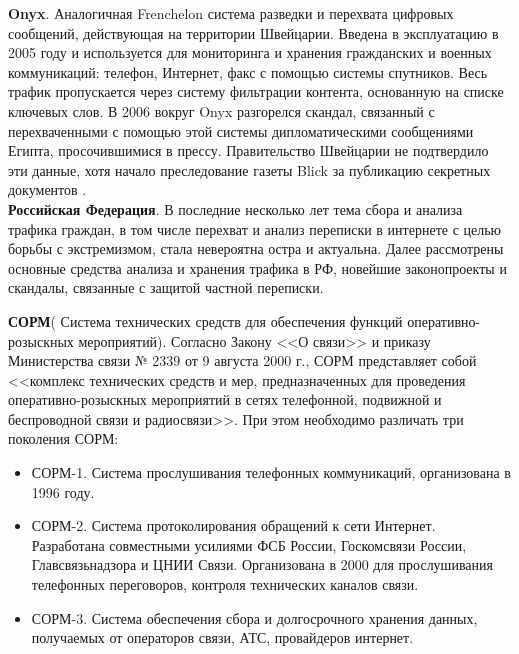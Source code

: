 	\textbf{Onyx}. Аналогичная Frenchelon система разведки и перехвата цифровых сообщений, действующая на территории Швейцарии. Введена в эксплуатацию в 2005 году	и используется для мониторинга и хранения гражданских и военных коммуникаций: телефон, Интернет, факс с помощью системы спутников. Весь трафик пропускается через систему фильтрации контента, основанную на списке ключевых слов. В 2006 вокруг Onyx разгорелся скандал, связанный с перехваченными с помощью этой системы дипломатическими сообщениями Египта, просочившимися в прессу. Правительство Швейцарии  не подтвердило эти данные, хотя начало преследование газеты  Blick за публикацию секретных документов \cite{Onyx}. %
	\\
	
	
	\textbf{Российская Федерация}.  В последние несколько лет тема сбора и анализа трафика граждан, в том числе перехват и анализ переписки в интернете с целью борьбы с экстремизмом, стала невероятна остра и актуальна. Далее рассмотрены основные средства анализа и хранения трафика  в РФ, новейшие законопроекты и скандалы, связанные с защитой частной переписки. 
	
	\textbf{СОРМ}( Система технических средств для обеспечения функций оперативно-розыскных мероприятий). Согласно Закону <<О связи>> и  приказу Министерства связи № 2339 от 9 августа 2000 г., СОРМ представляет собой <<комплекс технических средств и мер, предназначенных для проведения оперативно-розыскных мероприятий в сетях телефонной, подвижной и беспроводной связи и радиосвязи>>. %
	При этом необходимо различать три поколения СОРМ:
	\begin{itemize}
		\item СОРМ-1. Система прослушивания телефонных коммуникаций, организована в 1996 году.
		\item СОРМ-2.  Система протоколирования обращений к сети Интернет. Разработана совместными усилиями ФСБ России, Госкомсвязи России, Главсвязьнадзора и ЦНИИ Связи. Организована в 2000 для прослушивания телефонных переговоров, контроля технических каналов связи.
		\item СОРМ-3. Система обеспечения сбора и долгосрочного хранения данных, получаемых от операторов  связи, АТС,  провайдеров интернет.  
	\end{itemize}

